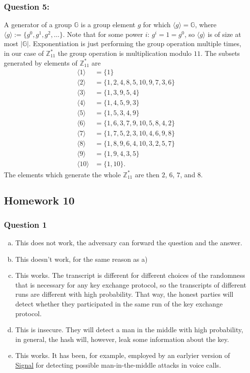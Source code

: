 \documentclass{article}
\numberwithin{defn}{section}
\numberwithin{equation}{section}
\begin{document}
\subsubsection*{Question 5:}
A generator of a group $\mathbb{G}$ is a group element $g$ for which $\langle g\rangle=\mathbb{G}$, where $\langle g \rangle:=\{ g^0,g^1,g^2,\dots  \}$. Note that for some power $i$: $g^i=1=g^0$, so $\langle g \rangle$ is of size at most $|\mathbb{G}|$. Exponentiation is just performing the group operation multiple times, in our case of $\mathbb{Z}_{11}^*$ the group operation is multiplication modulo $11$. The subsets generated by elements of $\mathbb{Z}_{11}^*$ are
\begin{align*}
\langle 1 \rangle &= \{1\}\\
\langle 2 \rangle &= \{1, 2, 4, 8, 5, 10, 9, 7, 3, 6\}\\
\langle 3 \rangle &= \{1, 3, 9, 5, 4\}\\
\langle 4 \rangle &= \{1, 4, 5, 9, 3\}\\
\langle 5 \rangle &= \{1, 5, 3, 4, 9\}\\
\langle 6 \rangle &= \{1, 6, 3, 7, 9, 10, 5, 8, 4, 2\}\\
\langle 7 \rangle &= \{1, 7, 5, 2, 3, 10, 4, 6, 9, 8\}\\
\langle 8 \rangle &= \{1, 8, 9, 6, 4, 10, 3, 2, 5, 7\}\\
\langle 9 \rangle &= \{1, 9, 4, 3, 5\}\\
\langle 10 \rangle &= \{1, 10\}.
\end{align*}
The elements which generate the whole $\mathbb{Z}_{11}^*$ are then $2$, $6$, $7$, and $8$.
	
	
	
\subsection*{Homework 10}

	\subsubsection*{Question 1}
	\begin{enumerate}[a)]
		\item This does not work, the adversary can forward the question and the answer.
		\item This doesn't work, for the same reason as a)
		\item This works. The transcript is different for different choices of the randomness that is necessary for any key exchange protocol, so the transcripts of different runs are different with high probability. That way, the honest parties will detect whether they participated in the same run of the key exchange protocol.
		\item This is insecure. They will detect a man in the middle with high probability, in general, the hash will, however, leak some information about the key.
		\item This works. It has been, for example, employed by an earlyier version of \href{https://signal.org/}{Signal} for detecting possible man-in-the-middle attacks in voice calls.
	\end{enumerate}
\end{document}
